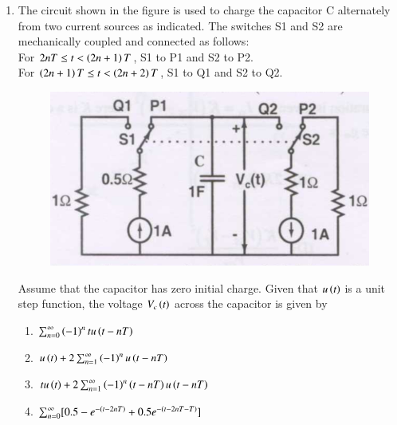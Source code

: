 \documentclass[a4paper, 11pt]{article}
\begin{document}
\begin{enumerate}
    \hfill{}

    \item The circuit shown in the figure is used to charge the capacitor C alternately from two current sources as indicated. The switches S1 and S2 are mechanically coupled and connected as follows:\\For $2nT \le t < \left(2n+1\right)T$, \quad {}   S1 to P1 and S2 to P2.\\For $\left(2n+1\right)T \le t < \left(2n+2\right)T$, \quad {}   S1 to Q1 and S2 to Q2.
    \begin{figure}[H]
        \centering
        \includegraphics[width=0.7\columnwidth]{figs/q23.png}
    \end{figure}
    Assume that the capacitor has zero initial charge. Given that $u\left(t\right)$ is a unit step function, the voltage $V_c\left(t\right)$ across the capacitor is given by
    \begin{enumerate}
        \item $\sum_{n=0}^{\infty}\left(-1\right)^n t u\left(t-nT\right)$
        \item $u\left(t\right) + 2 \sum_{n=1}^{\infty}\left(-1\right)^n u\left(t-nT\right)$
        \item $t u\left(t\right) + 2 \sum_{n=1}^{\infty}\left(-1\right)^n \left(t-nT\right) u\left(t-nT\right)$
        \item $\sum_{n=0}^{\infty} [0.5 - e^{-\left(t-2nT\right)} + 0.5e^{-\left(t-2nT-T\right)}]$
    \end{enumerate}
    
    \hfill{}


\end{enumerate}
\end{document}
